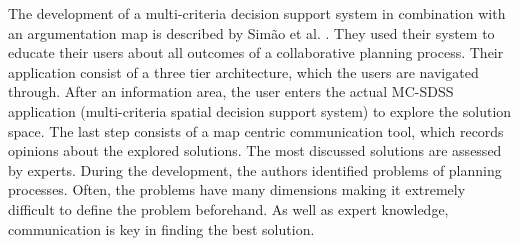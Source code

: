 The development of a multi-criteria decision support system in combination with an argumentation map is described by Sim\~{a}o et al. \cite{Simao2009Webbased}. They used their system to educate their users about all outcomes of a collaborative planning process. Their application consist of a three tier architecture, which the users are navigated through. After an information area, the user enters the actual MC-SDSS application (multi-criteria spatial decision support system) to explore the solution space. The last step consists of a map centric communication tool, which records opinions about the explored solutions. The most discussed solutions are assessed by experts. During the development, the authors identified problems of planning processes. Often, the problems have many dimensions making it extremely difficult to define the problem beforehand. As well as expert knowledge, communication is key in finding the best solution.

